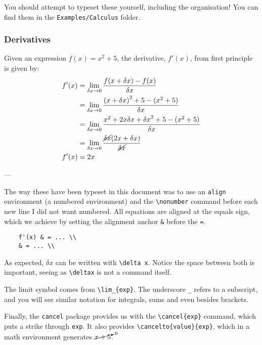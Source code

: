 You should attempt to typeset these yourself, including the organisation! You can find them in the \texttt{Examples/Calculus} folder.

\subsubsection{Derivatives}
Given an expression \( f(x) = x^2+5 \), the derivative, \( f'(x) \), from first principle is given by:
\begin{align}
    f'(x) &= \lim_{\delta x \to 0}
        \frac{
            f(x + \delta x) - f(x)
        }{ \delta x }
    \\
    &= \lim_{\delta x \to 0}
        \frac{
            {(x + \delta x)}^2+5 - (x^2+5)
        }{ \delta x }
    \nonumber \\
    &= \lim_{\delta x \to 0}
        \frac{
            x^2 + 2x\delta x + {\delta x}^2 +5 - (x^2+5)
        }{ \delta x }
    \nonumber \\
    &= \lim_{\delta x \to 0}
        \frac{
            \cancel{\delta x} (2x + \delta x)
        }{ \cancel{\delta x} }
    \nonumber \\
    f'(x) &= 2x 
\end{align}

---

The way these have been typeset in this document was to use an \verb|align| environment (a numbered environment) and the \verb|\nonumber| command before each new line I did not want numbered.
All equations are aligned at the equals sign, which we achieve by setting the alignment anchor \verb|&| before the \verb|=|.

\begin{lstlisting}
    f'(x) & = ... \\
    & = ... \\
\end{lstlisting} 

As expected, \( \delta x\) can be written with \verb|\delta x|. Notice the space between both is important, seeing as \verb|\deltax| is not a command itself.

The limit symbol comes from \verb|\lim_{exp}|. The underscore \verb|_| refers to a subscript, and you will see similar notation for integrals, sums and even besides brackets.

Finally, the \texttt{cancel} package provides us with the \verb|\cancel{exp}| command, which puts a strike through \verb|exp|.
It also provides \verb|\cancelto{value}{exp}|, which in a math environment generates \( \cancelto{0}{x+5} \).

